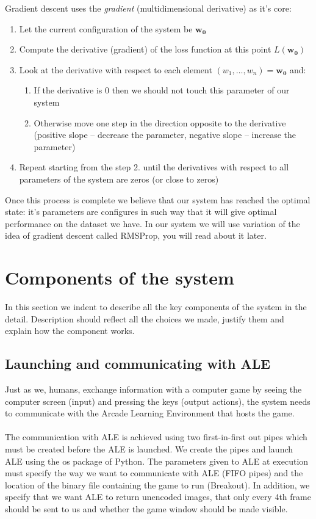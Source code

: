 \documentclass[a4paper,12pt]{article}
\begin{document}
Gradient descent uses the \emph{gradient} (multidimensional derivative) as it's core:
\begin{enumerate}
	\item Let the current configuration of the system be $\mathbf{w_0}$
	\item Compute the derivative (gradient) of the loss function at this point $L(\mathbf{w_0})$
	\item Look at the derivative with respect to each element $(w_1, \ldots, w_n) = \mathbf{w_0}$ and:
	\begin{enumerate}
		\item If the derivative is 0 then we should not touch this parameter of our system
		\item Otherwise move one step in the direction opposite to the derivative (positive slope -- decrease the parameter, negative slope -- increase the parameter)
	\end{enumerate}
	\item Repeat starting from the step 2. until the derivatives with respect to all parameters of the system are zeros (or close to zeros)
\end{enumerate}
Once this process is complete we believe that our system has reached the optimal state: it's parameters are configures in such way that it will give optimal performance on the dataset we have. In our system we will use variation of the idea of gradient descent called RMSProp, you will read about it later.



%
%
\pagebreak
\section{Components of the system}

In this section we indent to describe all the key components of the system in the detail. Description should reflect all the choices we made, justify them and explain how the component works.

\subsection{Launching and communicating with ALE}

Just as we, humans, exchange information with a computer game by seeing the computer screen (input) and pressing the keys (output actions), the system needs to communicate with the Arcade Learning Environment that hosts the game.
\paragraph{}
The communication with ALE is achieved using two first-in-first out pipes which must be created before the ALE is launched. We create the pipes and launch ALE using the os package of Python. The parameters given to ALE at execution must specify the way we want to communicate with ALE (FIFO pipes) and the location of the binary file containing the game to run (Breakout). In addition, we specify that we want ALE to return unencoded images, that only every 4th frame should be sent to us and whether the game window should be made visible.
\end{document}
